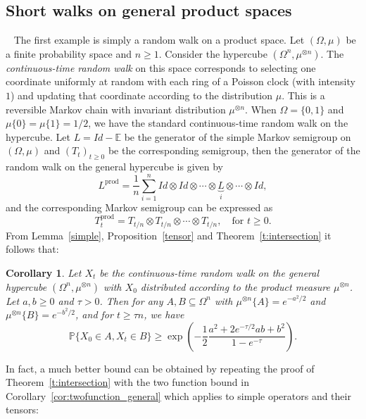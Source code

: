 \documentclass[11pt]{amsart}
\newcommand{\E}{\mathbb{E}}
\newcommand{\PP}{\mathbb{P}}
\newcommand{\1}{\mathbf{1}}
\def\E{{\mathbb E}}
\theoremstyle{definition}
\theoremstyle{plain}
\newtheorem{corollary}[example]{Corollary}
\theoremstyle{remark}
\newtheorem{remark}[example]{Remark}
\numberwithin{equation}{section}
\begin{document}
\subsection{Short walks on general product spaces}~\label{subsec:short}
The first example is simply a random walk on a product space.  Let $(\Omega, \mu) $ be a finite probability space and $n \ge 1$. Consider the hypercube $(\Omega^n, \mu^{\otimes n})$.
The {\em continuous-time random walk} on this space corresponds to selecting one coordinate uniformly at random with each ring of a Poisson clock (with intensity $1$) and updating that coordinate according to the distribution $\mu$. This is a reversible Markov chain with invariant distribution $\mu^{\otimes n}$. When $\Omega = \{0, 1\}$ and $\mu\{0\} = \mu\{1\} = 1/2$, we have the standard continuous-time random walk on the hypercube.
Let $L = Id - \E$ be the generator of the simple Markov semigroup on $(\Omega, \mu) $ and $(T_t)_{t \ge 0}$ be the corresponding semigroup, then the generator of the random walk on the general hypercube is given by
\[ L^{\mathrm{prod}}=  \frac{1}{n} \sum_{ i=1}^n Id \otimes  Id \otimes \cdots  \otimes \underbrace{L}_{i}  \otimes \cdots \otimes Id, \]
and the corresponding Markov semigroup can be expressed as
\[ T^\mathrm{prod}_t = T_{t/n} \otimes T_{t/n} \otimes \cdots \otimes T_{t/n}, \quad \text{for } t \ge 0.\]
From Lemma~\ref{simple}, Proposition~\ref{tensor} and Theorem~\ref{t:intersection}
it follows that:
\begin{corollary}
Let $X_t$ be the continuous-time random walk on the general hypercube $(\Omega^n, \mu^{\otimes n})$ with $X_0$
distributed according to the product measure $\mu^{\otimes n}$. Let $a, b \geq 0$ and $\tau>0$.
Then for any $A, B \subseteq\Omega^n$ with $\mu^{\otimes n} \{A\} = e^{ -a^2/2}$ and  $\mu^{\otimes n} \{B\} = e^{ -b^2/2}$, and for $t \ge \tau n$, we have
\begin{equation*}
\PP\{ X_0 \in A, X_t \in B \} \ge \exp \left( - \frac{1}{2} \frac{a^2 + 2 e^{-\tau/2}ab + b^2 }{1- e^{-\tau}} \right).
\end{equation*}
\end{corollary}

In fact, a much better bound can be obtained by repeating the proof of Theorem~\ref{t:intersection} with the two function bound in Corollary~\ref{cor:twofunction_general} which applies to simple operators and their tensors:
\end{document}
